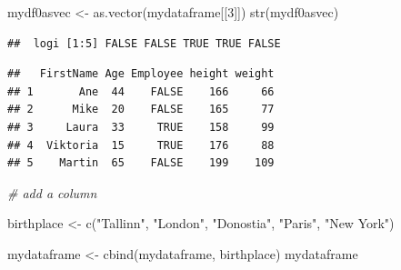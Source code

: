 \documentclass[
]{book}
\newenvironment{Shaded}{\begin{snugshade}}{\end{snugshade}}
\newcommand{\CommentTok}[1]{\textcolor[rgb]{0.56,0.35,0.01}{\textit{#1}}}
\newcommand{\DecValTok}[1]{\textcolor[rgb]{0.00,0.00,0.81}{#1}}
\newcommand{\FunctionTok}[1]{\textcolor[rgb]{0.00,0.00,0.00}{#1}}
\newcommand{\NormalTok}[1]{#1}
\newcommand{\OtherTok}[1]{\textcolor[rgb]{0.56,0.35,0.01}{#1}}
\newcommand{\SpecialCharTok}[1]{\textcolor[rgb]{0.00,0.00,0.00}{#1}}
\newcommand{\StringTok}[1]{\textcolor[rgb]{0.31,0.60,0.02}{#1}}
\begin{document}
\begin{Shaded}
\begin{Highlighting}[]
\NormalTok{mydf0asvec }\OtherTok{\textless{}{-}} \FunctionTok{as.vector}\NormalTok{(mydataframe[[}\DecValTok{3}\NormalTok{]])}
\FunctionTok{str}\NormalTok{(mydf0asvec)}
\end{Highlighting}
\end{Shaded}

\begin{verbatim}
##  logi [1:5] FALSE FALSE TRUE TRUE FALSE
\end{verbatim}

\begin{Shaded}
\end{Shaded}

\begin{verbatim}
##   FirstName Age Employee height weight
## 1       Ane  44    FALSE    166     66
## 2      Mike  20    FALSE    165     77
## 3     Laura  33     TRUE    158     99
## 4  Viktoria  15     TRUE    176     88
## 5    Martin  65    FALSE    199    109
\end{verbatim}

\begin{Shaded}
\begin{Highlighting}[]
\CommentTok{\# add a column }

\NormalTok{birthplace }\OtherTok{\textless{}{-}} \FunctionTok{c}\NormalTok{(}\StringTok{"Tallinn"}\NormalTok{, }\StringTok{"London"}\NormalTok{, }\StringTok{"Donostia"}\NormalTok{, }\StringTok{"Paris"}\NormalTok{, }\StringTok{"New York"}\NormalTok{)}

\NormalTok{mydataframe }\OtherTok{\textless{}{-}} \FunctionTok{cbind}\NormalTok{(mydataframe, birthplace)}
\NormalTok{mydataframe}
\end{Highlighting}
\end{Shaded}
\end{document}
